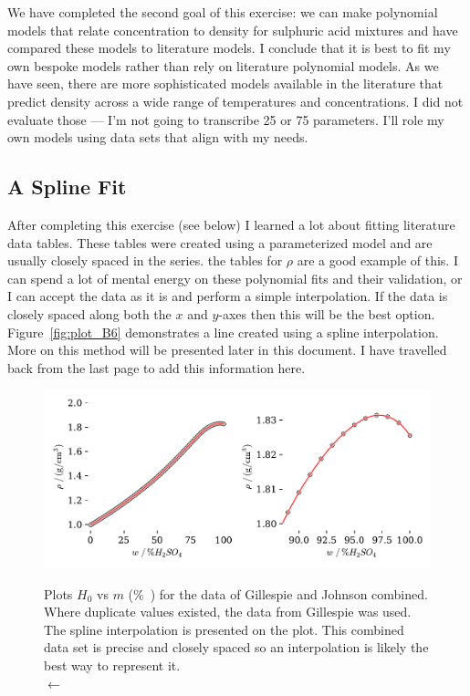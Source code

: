\documentclass[]{tufte-handout}
\begin{document}

We have completed the second goal of this exercise: we can make polynomial models that relate concentration to density for sulphuric acid mixtures and have compared these models to literature models. I conclude that it is best to fit my own bespoke models rather than rely on literature polynomial models. As we have seen, there are more sophisticated models available in the literature that predict density across a wide range of temperatures and concentrations. I did not evaluate those --- I'm not going to transcribe 25 or 75 parameters. I'll role my own models using data sets that align with my needs.

\subsection{A Spline Fit}

After completing this exercise (see below) I learned a lot about fitting literature data tables. These tables were created using a parameterized model and are usually closely spaced in the series. the tables for $\rho$ are a good example of this. I can spend a lot of mental energy on these polynomial fits and their validation, or I can accept the data as it is and perform a simple interpolation. If the data is closely spaced along both the $x$ and $y$-axes then this will be the best option. Figure~\vref{fig:plot_B6} demonstrates a line created using a spline interpolation. More on this method will be presented later in this document. I have travelled back from the last page to add this information here.

\begin{figure}
  \centering
  \caption{Plots $H_0$ vs $m$ (\unit{\percent{}}) for the data of Gillespie and Johnson combined. Where duplicate values existed, the data from Gillespie was used. The spline interpolation is presented on the plot. This combined data set is precise and closely spaced so an interpolation is likely the best way to represent it.\\ $\longleftarrow$} 
  \hspace*{-10mm}
 \includegraphics[scale=0.75]{images/plot_B6} 
  \label{fig:plot_B6}
\end{figure}
\end{document}

